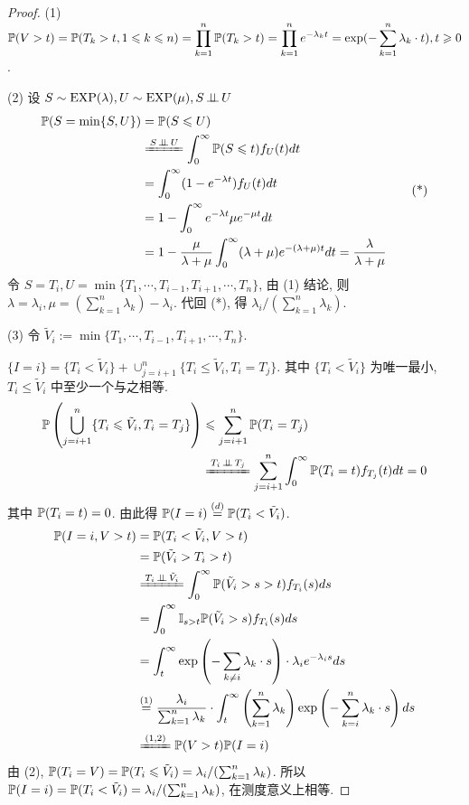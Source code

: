 \begin{proof}
(1) $\displaystyle\mathbb{P}(V>t)=\mathbb{P}(T_k>t,1\leqslant k\leqslant n)=\prod_{k=1}^n\mathbb{P}(T_k>t)=\prod_{k=1}^n e^{-\lambda_k t}=\exp (-\sum_{k=1}^n\lambda_k\cdot t), t\geqslant 0$.

(2) 设 $S\sim\operatorname{EXP}(\lambda), U\sim\operatorname{EXP}(\mu), S\operatorname{\perp\!\!\!\perp} U$
\[
\begin{aligned}
    \PP(S=\min\{S,U\}) &=\PP(S\leq U)\\
    &\xlongequal{S\ind U}\int_0^{\infty}\PP(S\leq t)f_U(t)dt\\
    &=\int_0^{\infty}(1-e^{-\lambda t})f_U(t)dt\\
    &=1-\int_0^{\infty}e^{-\lambda t}\mu e^{-\mu t}dt\\
    &=1-\frac{\mu}{\lambda+\mu}\int_0^{\infty}(\lambda+\mu)e^{-(\lambda+\mu)t}dt=\frac{\lambda}{\lambda+\mu}
\end{aligned}
\tag{*}
\]
令 $S=T_i, U=\min\{T_1,\cdots,T_{i-1},T_{i+1},\cdots,T_n\}$, 由 (1) 结论, 则 $\lambda=\lambda_i,\mu=(\sum_{k=1}^n\lambda_k)-\lambda_i$. 代回 (*), 得 $\lambda_i/(\sum_{k=1}^n\lambda_k)$.

(3) 令 $\tilde{V}_i:=\min\{T_1,\cdots,T_{i-1},T_{i+1},\cdots,T_n\}$.

$\{I=i\}=\{T_i<\tilde{V}_i\}+\cup_{j=i+1}^n\{T_i\leq \tilde{V}_i,T_i=T_j\}$. 其中 $\{T_i<\tilde{V}_i\}$ 为唯一最小, $T_i\leq \tilde{V}_i$ 中至少一个与之相等.
\[
\begin{aligned}
    \PP\left(\bigcup_{j=i+1}^n\{T_i\leq \tilde{V}_i, T_i=T_j\}\right) & \leq \sum_{j=i+1}^n\PP(T_i=T_j)\\
    &\xlongequal{T_i\ind T_j}\sum_{j=i+1}^n \int_0^{\infty}\PP(T_i=t)f_{T_j}(t)dt=0
\end{aligned}
\]
其中 $\mathbb{P}(T_i=t)=0$. 由此得 $\mathbb{P}(I=i)\overset{(d)}{=}\mathbb{P}(T_i<\tilde{V}_i)$.
\[
\begin{aligned}
    \PP(I=i,V>t)&=\PP(T_i<\tilde{V}_i,V>t)\\
    &=\PP(\tilde{V}_i>T_i>t)\\
    &\xlongequal{T_i\ind \tilde{V}_i}\int_0^{\infty}\PP(\tilde{V}_i>s>t)f_{T_i}(s)ds\\
    &=\int_0^{\infty}\II_{s>t}\PP(\tilde{V}_i>s)f_{T_i}(s)ds\\
    &=\int_t^{\infty}\exp\left(-\sum_{k\neq i}\lambda_k\cdot s\right)\cdot\lambda_i e^{-\lambda_i s}ds\\
    &\overset{(1)}{=}\frac{\lambda_i}{\sum_{k=1}^n \lambda_k}\cdot\int_t^{\infty}\left(\sum_{k=1}^n\lambda_k\right)\exp\left(-\sum_{k=i}^n\lambda_k\cdot s\right)ds\\
    &\xlongequal{(1,2)}\PP(V>t)\PP(I=i)
\end{aligned}
\]
由 (2), $\mathbb{P}(T_i=V)=\mathbb{P}(T_i\leqslant \tilde{V}_i)=\lambda_i/(\sum_{k=1}^n \lambda_k)$. 所以 $\mathbb{P}(I=i)=\mathbb{P}(T_i<\tilde{V}_i)=\lambda_i/(\sum_{k=1}^n \lambda_k)$, 在测度意义上相等.
\end{proof}

